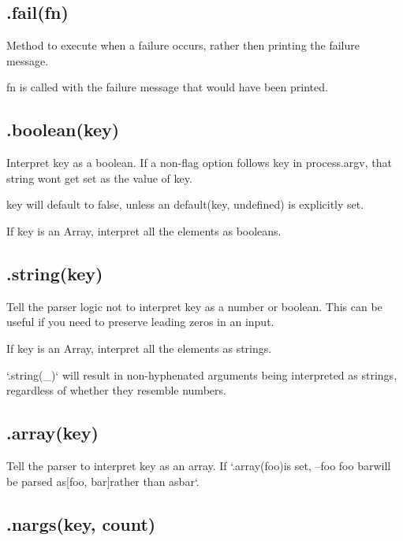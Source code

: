 \subsection*{.fail(fn) }

Method to execute when a failure occurs, rather then printing the failure message.

{\ttfamily fn} is called with the failure message that would have been printed.

\subsection*{.boolean(key) }

Interpret {\ttfamily key} as a boolean. If a non-\/flag option follows {\ttfamily key} in {\ttfamily process.\+argv}, that string won\textquotesingle{}t get set as the value of {\ttfamily key}.

{\ttfamily key} will default to {\ttfamily false}, unless an {\ttfamily default(key, undefined)} is explicitly set.

If {\ttfamily key} is an Array, interpret all the elements as booleans.

\subsection*{.string(key) }

Tell the parser logic not to interpret {\ttfamily key} as a number or boolean. This can be useful if you need to preserve leading zeros in an input.

If {\ttfamily key} is an Array, interpret all the elements as strings.

`.string(\textquotesingle{}\+\_\+\textquotesingle{})` will result in non-\/hyphenated arguments being interpreted as strings, regardless of whether they resemble numbers.

\subsection*{.array(key) }

Tell the parser to interpret {\ttfamily key} as an array. If `.array(\textquotesingle{}foo\textquotesingle{}){\ttfamily is set, }--foo foo bar{\ttfamily will be parsed as}\mbox{[}\textquotesingle{}foo\textquotesingle{}, \textquotesingle{}bar\textquotesingle{}\mbox{]}{\ttfamily rather than as}\textquotesingle{}bar\textquotesingle{}`.

\subsection*{.nargs(key, count) }

